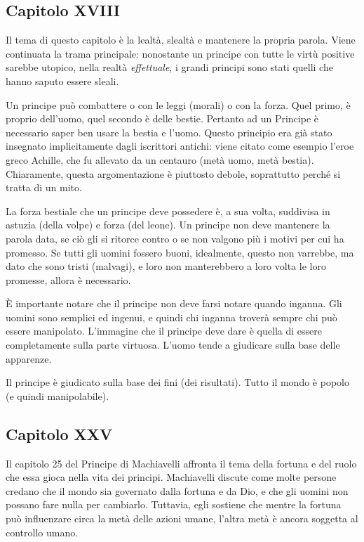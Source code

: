 \documentclass[a4paper]{article}
\begin{document}
\pagebreak

\subsection{Capitolo XVIII}

Il tema di questo capitolo è la lealtà, slealtà e mantenere
la propria parola.
Viene continuata la trama principale:
nonostante un principe con tutte le virtù positive
sarebbe utopico, nella realtà \textit{effettuale},
i grandi principi sono stati quelli che hanno saputo essere sleali.


Un principe può combattere o con le leggi (morali)
o con la forza. Quel primo, è proprio dell'uomo, quel secondo
è delle bestie.
Pertanto ad un Principe è necessario saper ben usare la bestia e l'uomo.
Questo principio era già stato insegnato implicitamente dagli iscrittori antichi:
viene citato come esempio l'eroe greco Achille, che fu allevato
da un centauro (metà uomo, metà bestia).
Chiaramente, questa argomentazione è piuttosto debole,
soprattutto perché si tratta di un mito.

La forza bestiale che un principe deve possedere è, a sua volta,
suddivisa in astuzia (della volpe) e forza (del leone).
Un principe non deve mantenere la parola data, se ciò
gli si ritorce contro o se non valgono più i motivi per cui ha promesso.
Se tutti gli uomini fossero buoni, idealmente, questo non varrebbe,
ma dato che sono tristi (malvagi), e loro non manterebbero
a loro volta le loro promesse, allora è necessario.

È importante notare che il principe non deve farsi notare
quando inganna. Gli uomini sono semplici ed ingenui, e quindi
chi inganna troverà sempre chi può essere manipolato.
L'immagine che il principe deve dare
è quella di essere completamente sulla parte virtuosa.
L'uomo tende a giudicare sulla base delle apparenze.

Il principe è giudicato sulla base dei fini (dei risultati).
Tutto il mondo è popolo (e quindi manipolabile).

\subsection{Capitolo XXV}

Il capitolo 25 del Principe di Machiavelli affronta il tema della fortuna e del ruolo che essa gioca nella vita dei principi. Machiavelli discute come molte persone credano che il mondo sia governato dalla fortuna e da Dio, e che gli uomini non possano fare nulla per cambiarlo. Tuttavia, egli sostiene che mentre la fortuna può influenzare circa la metà delle azioni umane, l'altra metà è ancora soggetta al controllo umano.
\end{document}
